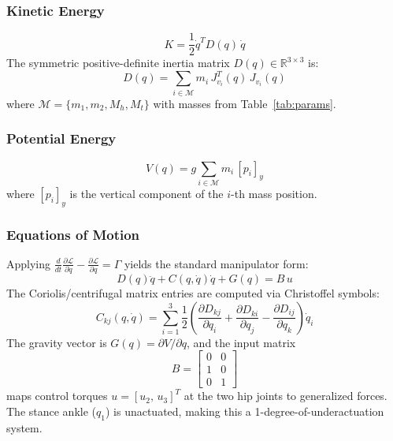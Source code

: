 \documentclass[conference]{IEEEtran}
\begin{document}
\subsubsection{Kinetic Energy}
\begin{equation}
    K = \frac{1}{2}\dot{q}^T D(q)\,\dot{q}
\end{equation}
The symmetric positive-definite inertia matrix $D(q) \in \mathbb{R}^{3\times 3}$ is:
\begin{equation}
    D(q) = \sum_{i \in \mathcal{M}} m_i\, J_{v_i}^T(q)\, J_{v_i}(q) \label{eq:inertia}
\end{equation}
where $\mathcal{M} = \{m_1, m_2, M_h, M_t\}$ with masses from Table~\ref{tab:params}.

\subsubsection{Potential Energy}
\begin{equation}
    V(q) = g\sum_{i \in \mathcal{M}} m_i\, [p_i]_y
\end{equation}
where $[p_i]_y$ is the vertical component of the $i$-th mass position.

\subsubsection{Equations of Motion}
Applying $\frac{d}{dt}\frac{\partial\mathcal{L}}{\partial\dot{q}} - \frac{\partial\mathcal{L}}{\partial q} = \Gamma$ yields the standard manipulator form:
\begin{equation}
    D(q)\ddot{q} + C(q,\dot{q})\dot{q} + G(q) = B\,u \label{eq:eom}
\end{equation}
The Coriolis/centrifugal matrix entries are computed via Christoffel symbols:
\begin{equation}
    C_{kj}(q,\dot{q}) = \sum_{i=1}^{3} \frac{1}{2}\!\left(\frac{\partial D_{kj}}{\partial q_i} + \frac{\partial D_{ki}}{\partial q_j} - \frac{\partial D_{ij}}{\partial q_k}\right)\!\dot{q}_i
\end{equation}
The gravity vector is $G(q) = \partial V/\partial q$, and the input matrix
\begin{equation}
    B = \begin{bmatrix} 0 & 0 \\ 1 & 0 \\ 0 & 1 \end{bmatrix} \label{eq:B}
\end{equation}
maps control torques $u = [u_2,\, u_3]^T$ at the two hip joints to generalized forces. The stance ankle ($q_1$) is unactuated, making this a 1-degree-of-underactuation system.
\end{document}
